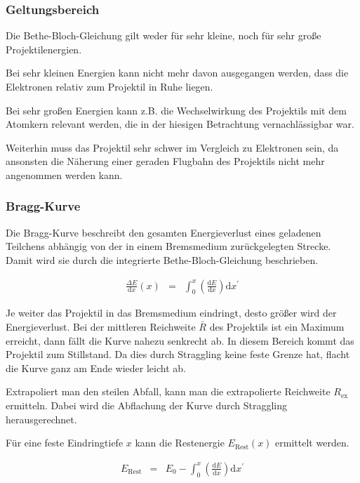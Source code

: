 \documentclass[12pt,a4paper]{scrartcl}
\numberwithin{equation}{section} %
\renewcommand{\[}{} %
\renewcommand{\]}{\noindent} %
\begin{document}
\hypertarget{geltungsbereich}{%
\subsubsection{Geltungsbereich}\label{geltungsbereich}}

Die Bethe-Bloch-Gleichung gilt weder für sehr kleine, noch für sehr
große Projektilenergien.

Bei sehr kleinen Energien kann nicht mehr davon ausgegangen werden, dass
die Elektronen relativ zum Projektil in Ruhe liegen.

Bei sehr großen Energien kann z.B. die Wechselwirkung des Projektils mit
dem Atomkern relevant werden, die in der hiesigen Betrachtung
vernachlässigbar war.

Weiterhin muss das Projektil sehr schwer im Vergleich zu Elektronen
sein, da ansonsten die Näherung einer geraden Flugbahn des Projektils
nicht mehr angenommen werden kann.

\hypertarget{bragg-kurve}{%
\subsubsection{Bragg-Kurve}\label{bragg-kurve}}

Die Bragg-Kurve beschreibt den gesamten Energieverlust eines geladenen
Teilchens abhängig von der in einem Bremsmedium zurückgelegten Strecke.
Damit wird sie durch die integrierte Bethe-Bloch-Gleichung beschrieben.

\[
\begin{eqnarray}
    \frac{\Delta E}{\mathrm dx}(x) &=&
        \int_0^x \left(\frac{\mathrm dE}{\mathrm dx}\right) \mathrm dx^\prime
\end{eqnarray}
\]

Je weiter das Projektil in das Bremsmedium eindringt, desto größer wird
der Energieverlust. Bei der mittleren Reichweite \(\bar R\) des
Projektils ist ein Maximum erreicht, dann fällt die Kurve nahezu
senkrecht ab. In diesem Bereich kommt das Projektil zum Stillstand. Da
dies durch Straggling keine feste Grenze hat, flacht die Kurve ganz am
Ende wieder leicht ab.

Extrapoliert man den steilen Abfall, kann man die extrapolierte
Reichweite \(R_\mathrm{ex}\) ermitteln. Dabei wird die Abflachung der
Kurve durch Straggling herausgerechnet.

Für eine feste Eindringtiefe \(x\) kann die Restenergie
\(E_\mathrm{Rest}(x)\) ermittelt werden.

\[
\begin{eqnarray}
    E_\mathrm{Rest}
        &=& E_0
        - \int_0^x \left(\frac{\mathrm dE}{\mathrm dx}\right) \mathrm dx^\prime
        \label{Restenergie}
\end{eqnarray}
\]
\end{document}
